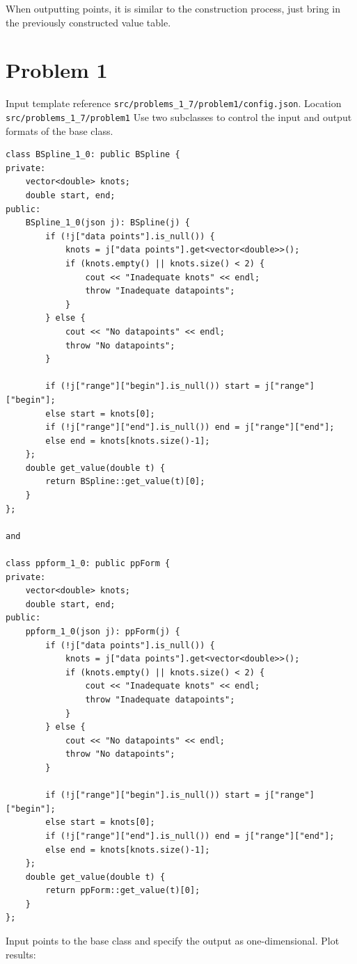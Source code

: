 \documentclass[a4paper]{article}
\begin{document}
When outputting points, it is similar to the construction process, just bring in the previously constructed value table.\\

\section*{Problem 1}
Input template reference \texttt{src/problems\_1\_7/problem1/config.json}.
Location \texttt{src/problems\_1\_7/problem1}
Use two subclasses to control the input and output formats of the base class.

\begin{verbatim}
class BSpline_1_0: public BSpline {
private:
    vector<double> knots; 
    double start, end;
public:
    BSpline_1_0(json j): BSpline(j) {
        if (!j["data points"].is_null()) {
            knots = j["data points"].get<vector<double>>();
            if (knots.empty() || knots.size() < 2) {
                cout << "Inadequate knots" << endl;
                throw "Inadequate datapoints";
            }
        } else {
            cout << "No datapoints" << endl;
            throw "No datapoints";
        }
        
        if (!j["range"]["begin"].is_null()) start = j["range"]["begin"];
        else start = knots[0];
        if (!j["range"]["end"].is_null()) end = j["range"]["end"];
        else end = knots[knots.size()-1];
    };
    double get_value(double t) {
        return BSpline::get_value(t)[0];
    }
};

and

class ppform_1_0: public ppForm {
private:
    vector<double> knots;
    double start, end;
public:
    ppform_1_0(json j): ppForm(j) {
        if (!j["data points"].is_null()) {
            knots = j["data points"].get<vector<double>>();
            if (knots.empty() || knots.size() < 2) {
                cout << "Inadequate knots" << endl;
                throw "Inadequate datapoints";
            }
        } else {
            cout << "No datapoints" << endl;
            throw "No datapoints";
        }
        
        if (!j["range"]["begin"].is_null()) start = j["range"]["begin"];
        else start = knots[0];
        if (!j["range"]["end"].is_null()) end = j["range"]["end"];
        else end = knots[knots.size()-1];
    };
    double get_value(double t) {
        return ppForm::get_value(t)[0];
    }
};
\end{verbatim}

Input points to the base class and specify the output as one-dimensional.
Plot results:
\end{document}
